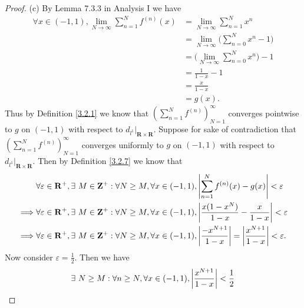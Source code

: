 \begin{proof}{(c)}
    By Lemma 7.3.3 in Analysis I we have
    \begin{align*}
        \forall x \in (-1, 1), \lim_{N \to \infty} \sum_{n = 1}^N f^{(n)}(x) & = \lim_{N \to \infty} \sum_{n = 1}^N x^n                 \\
                                                                             & = \lim_{N \to \infty} \bigg(\sum_{n = 0}^N x^n - 1\bigg) \\
                                                                             & = \bigg(\lim_{N \to \infty} \sum_{n = 0}^N x^n\bigg) - 1 \\
                                                                             & = \frac{1}{1 - x} - 1                                    \\
                                                                             & = \frac{x}{1 - x}                                        \\
                                                                             & = g(x).
    \end{align*}
    Thus by Definition \ref{3.2.1} we know that \((\sum_{n = 1}^N f^{(n)})_{N = 1}^\infty\) converges pointwise to \(g\) on \((-1, 1)\) with respect to \(d_{l^1}|_{\mathbf{R} \times \mathbf{R}}\).
    Suppose for sake of contradiction that \((\sum_{n = 1}^N f^{(n)})_{N = 1}^\infty\) converges uniformly to \(g\) on \((-1, 1)\) with respect to \(d_{l^1}|_{\mathbf{R} \times \mathbf{R}}\).
    Then by Definition \ref{3.2.7} we know that
    \begin{align*}
                 & \forall \varepsilon \in \mathbf{R}^+, \exists\ M \in \mathbf{Z}^+ : \forall N \geq M, \forall x \in (-1, 1), \abs*{\sum_{n = 1}^N f^{(n)}(x) - g(x)} < \varepsilon                           \\
        \implies & \forall \varepsilon \in \mathbf{R}^+, \exists\ M \in \mathbf{Z}^+ : \forall N \geq M, \forall x \in (-1, 1), \abs*{\frac{x(1 - x^N)}{1 - x} - \frac{x}{1 - x}} < \varepsilon                 \\
        \implies & \forall \varepsilon \in \mathbf{R}^+, \exists\ M \in \mathbf{Z}^+ : \forall N \geq M, \forall x \in (-1, 1), \abs*{\frac{-x^{N + 1}}{1 - x}} = \abs*{\frac{x^{N + 1}}{1 - x}} < \varepsilon.
    \end{align*}
    Now consider \(\varepsilon = \frac{1}{2}\).
    Then we have
    \begin{align*}
                 & \exists\ N \geq M : \forall n \geq N, \forall x \in (-1, 1), \abs*{\frac{x^{N + 1}}{1 - x}} < \frac{1}{2}                                                               \\

\end{align*}
\end{proof}
